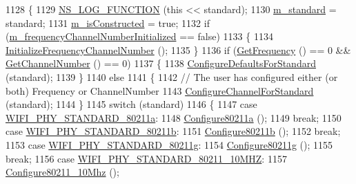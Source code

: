\begin{DoxyCode}
1128 \{
1129   \hyperlink{log-macros-disabled_8h_a90b90d5bad1f39cb1b64923ea94c0761}{NS\_LOG\_FUNCTION} (\textcolor{keyword}{this} << standard);
1130   \hyperlink{classns3_1_1WifiPhy_a7c00b0f710272e82eea04068c920a98f}{m\_standard} = standard;
1131   \hyperlink{classns3_1_1WifiPhy_a61f888ec1fe29d38d206df607596161f}{m\_isConstructed} = \textcolor{keyword}{true};
1132   \textcolor{keywordflow}{if} (\hyperlink{classns3_1_1WifiPhy_aac5b6bb7af0e3c2c3590ab1d893a34d2}{m\_frequencyChannelNumberInitialized} == \textcolor{keyword}{false})
1133     \{
1134       \hyperlink{classns3_1_1WifiPhy_a6f926737f6ba77c4b619734f396ed3ed}{InitializeFrequencyChannelNumber} ();
1135     \}
1136   \textcolor{keywordflow}{if} (\hyperlink{classns3_1_1WifiPhy_ad2508d94faf22d690d6b8b4367934fd1}{GetFrequency} () == 0 && \hyperlink{classns3_1_1WifiPhy_a5cf0ccf06109ace61db51c83e91b7e8d}{GetChannelNumber} () == 0)
1137     \{
1138       \hyperlink{classns3_1_1WifiPhy_ae5a54012ac4703d86299312251c41114}{ConfigureDefaultsForStandard} (standard);
1139     \}
1140   \textcolor{keywordflow}{else}
1141     \{
1142       \textcolor{comment}{// The user has configured either (or both) Frequency or ChannelNumber}
1143       \hyperlink{classns3_1_1WifiPhy_aed528417ac25eecc7ecf44079d162847}{ConfigureChannelForStandard} (standard);
1144     \}
1145   \textcolor{keywordflow}{switch} (standard)
1146     \{
1147     \textcolor{keywordflow}{case} \hyperlink{group__wifi_gga1299834f4e1c615af3ca738033b76a49a22db1e8022db2c3450414b86c77b11e4}{WIFI\_PHY\_STANDARD\_80211a}:
1148       \hyperlink{classns3_1_1WifiPhy_a3f4c48226fee10de85a17e6ce62af0f3}{Configure80211a} ();
1149       \textcolor{keywordflow}{break};
1150     \textcolor{keywordflow}{case} \hyperlink{group__wifi_gga1299834f4e1c615af3ca738033b76a49a77e1cc9f77a0bce8e2bc82cbef437b5a}{WIFI\_PHY\_STANDARD\_80211b}:
1151       \hyperlink{classns3_1_1WifiPhy_a6d06ede65c6956ad9c414a00587279d7}{Configure80211b} ();
1152       \textcolor{keywordflow}{break};
1153     \textcolor{keywordflow}{case} \hyperlink{group__wifi_gga1299834f4e1c615af3ca738033b76a49aeda6d90f260393ce003ec4765d8100af}{WIFI\_PHY\_STANDARD\_80211g}:
1154       \hyperlink{classns3_1_1WifiPhy_a71286ced86fbd1b11c4b68e053b3e8d0}{Configure80211g} ();
1155       \textcolor{keywordflow}{break};
1156     \textcolor{keywordflow}{case} \hyperlink{group__wifi_gga1299834f4e1c615af3ca738033b76a49aff863c98db467eb76170dc8bbe743de7}{WIFI\_PHY\_STANDARD\_80211\_10MHZ}:
1157       \hyperlink{classns3_1_1WifiPhy_a42b42da70fb83cc0136c78658698c620}{Configure80211\_10Mhz} ();

\end{DoxyCode}
